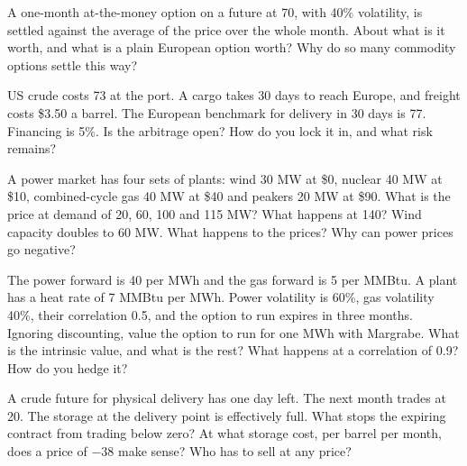 \begin{question}\label{iq:iv2:commodities-and-energy:11}
A one-month at-the-money option on a future at 70, with 40\% volatility, is settled against the average of the price over the whole month. About what is it worth, and what is a plain European option worth? Why do so many commodity options settle this way?
\end{question}

\begin{question}\label{iq:iv2:commodities-and-energy:12}
US crude costs 73 at the port. A cargo takes 30 days to reach Europe, and freight costs \$3.50 a barrel. The European benchmark for delivery in 30 days is 77. Financing is 5\%. Is the arbitrage open? How do you lock it in, and what risk remains?
\end{question}

\begin{question}\label{iq:iv2:commodities-and-energy:13}
A power market has four sets of plants: wind 30 MW at \$0, nuclear 40 MW at \$10, combined-cycle gas 40 MW at \$40 and peakers 20 MW at \$90. What is the price at demand of 20, 60, 100 and 115 MW? What happens at 140? Wind capacity doubles to 60 MW. What happens to the prices? Why can power prices go negative?
\end{question}

\begin{question}\label{iq:iv2:commodities-and-energy:14}
The power forward is 40 per MWh and the gas forward is 5 per MMBtu. A plant has a heat rate of 7 MMBtu per MWh. Power volatility is 60\%, gas volatility 40\%, their correlation 0.5, and the option to run expires in three months. Ignoring discounting, value the option to run for one MWh with Margrabe. What is the intrinsic value, and what is the rest? What happens at a correlation of 0.9? How do you hedge it?
\end{question}

\begin{question}\label{iq:iv2:commodities-and-energy:15}
A crude future for physical delivery has one day left. The next month trades at 20. The storage at the delivery point is effectively full. What stops the expiring contract from trading below zero? At what storage cost, per barrel per month, does a price of $-38$ make sense? Who has to sell at any price?
\end{question}

